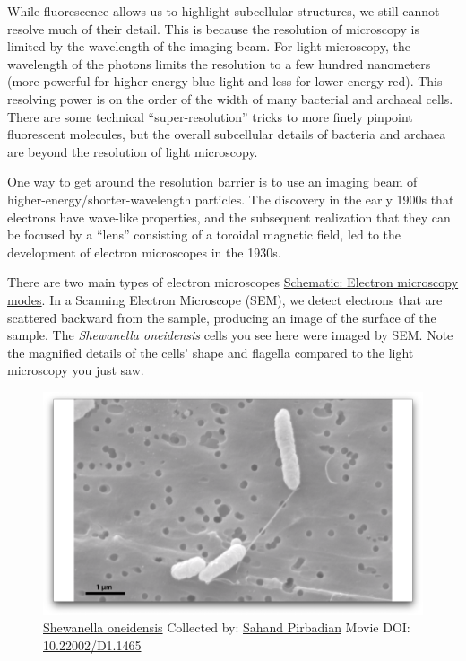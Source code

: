 \documentclass[]{tufte-book}
\begin{document}
While fluorescence allows us to highlight subcellular structures, we
still cannot resolve much of their detail. This is because the
resolution of microscopy is limited by the wavelength of the imaging
beam. For light microscopy, the wavelength of the photons limits the
resolution to a few hundred nanometers (more powerful for higher-energy
blue light and less for lower-energy red). This resolving power is on
the order of the width of many bacterial and archaeal cells. There are
some technical ``super-resolution'' tricks to more finely pinpoint
fluorescent molecules, but the overall subcellular details of bacteria
and archaea are beyond the resolution of light microscopy.

One way to get around the resolution barrier is to use an imaging beam
of higher-energy/shorter-wavelength particles. The discovery in the
early 1900s that electrons have wave-like properties, and the subsequent
realization that they can be focused by a ``lens'' consisting of a
toroidal magnetic field, led to the development of electron microscopes
in the 1930s.

There are two main types of electron microscopes
\protect\hyperlink{Electron_microscopy_modes}{Schematic: Electron
microscopy modes}. In a Scanning Electron Microscope (SEM), we detect
electrons that are scattered backward from the sample, producing an
image of the surface of the sample. The \emph{Shewanella oneidensis}
cells you see here were imaged by SEM. Note the magnified details of the
cells' shape and flagella compared to the light microscopy you just saw.





\begin{figure}
\includegraphics{movie_stills/1_3} \caption[\protect\hyperlink{tree}{Shewanella oneidensis} Collected by:
\protect\hyperlink{sahand_pirbadian}{Sahand Pirbadian} Movie DOI:
\href{https://doi.org/10.22002/D1.1465}{10.22002/D1.1465}]{\protect\hyperlink{tree}{Shewanella oneidensis} Collected by:
\protect\hyperlink{sahand_pirbadian}{Sahand Pirbadian} Movie DOI:
\href{https://doi.org/10.22002/D1.1465}{10.22002/D1.1465}}\label{fig:1-3}
\end{figure}
\end{document}
